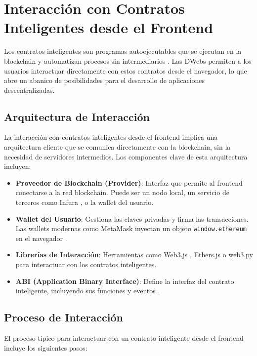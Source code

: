 \section{Interacción con Contratos Inteligentes desde el Frontend}

Los contratos inteligentes son programas autoejecutables que se ejecutan en la blockchain y automatizan procesos sin intermediarios \cite{buterin2014next}. Las DWebs permiten a los usuarios interactuar directamente con estos contratos desde el navegador, lo que abre un abanico de posibilidades para el desarrollo de aplicaciones descentralizadas.

\subsection{Arquitectura de Interacción}

La interacción con contratos inteligentes desde el frontend implica una arquitectura cliente que se comunica directamente con la blockchain, sin la necesidad de servidores intermedios. Los componentes clave de esta arquitectura incluyen:

\begin{itemize}
    \item \textbf{Proveedor de Blockchain (Provider)}: Interfaz que permite al frontend conectarse a la red blockchain. Puede ser un nodo local, un servicio de terceros como Infura \cite{infura}, o la wallet del usuario.
    \item \textbf{Wallet del Usuario}: Gestiona las claves privadas y firma las transacciones. Las wallets modernas como MetaMask inyectan un objeto \texttt{window.ethereum} en el navegador \cite{metamask}.
    \item \textbf{Librerías de Interacción}: Herramientas como Web3.js \cite{web3js}, Ethers.js \cite{ethersjs} o web3.py para interactuar con los contratos inteligentes.
    \item \textbf{ABI (Application Binary Interface)}: Define la interfaz del contrato inteligente, incluyendo sus funciones y eventos \cite{soliditydocs}.
\end{itemize}

\subsection{Proceso de Interacción}

El proceso típico para interactuar con un contrato inteligente desde el frontend incluye los siguientes pasos:

